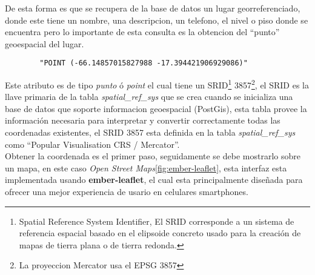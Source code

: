     De esta forma es que se recupera de la base de datos un lugar georreferenciado, donde este tiene un nombre, una descripcion, un telefono, el nivel o piso donde se encuentra pero lo importante de esta consulta es la obtencion del ``punto'' geoespacial del lugar.

    \begin{center}
      \begin{verbatim}
        "POINT (-66.14857015827988 -17.394421906929086)"
      \end{verbatim}
    \end{center}



     Este atributo es de tipo \emph{punto} \'o \emph{point} el cual tiene un SRID\footnote{ Spatial Reference System Identifier, El SRID corresponde a un sistema de referencia espacial basado en el elipsoide concreto usado para la creación de mapas de tierra plana o de tierra redonda.\cite{msdn_srid} } 3857\footnote{La proyeccion Mercator usa el EPSG 3857}, el SRID  es la llave primaria de la tabla \emph{spatial\_ref\_sys} que se crea cuando se inicializa una base de datos que soporte informacion geoespacial (PostGis), esta tabla provee la informaci\'on necesaria para interpretar y convertir correctamente todas las coordenadas existentes, el SRID 3857 esta definida en la tabla \emph{spatial\_ref\_sys} como ``Popular Visualisation CRS / Mercator''.\\


    Obtener la coordenada es el primer paso, seguidamente se debe mostrarlo sobre un mapa, en este caso \emph{Open Street Maps}\ref{fig:ember-leaflet}, esta interfaz esta implementada usando \textbf{ember-leaflet}, el cual esta principalmente dise\~nada para ofrecer una mejor experiencia de usario en celulares smartphones.\\


